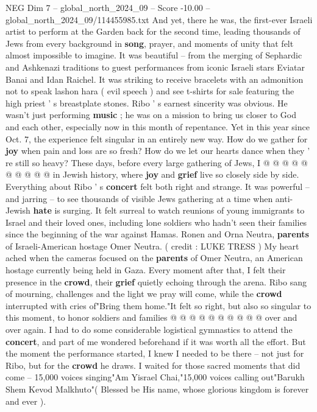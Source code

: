 \begin{textsample}{NEG Dim 7 – global\_north\_2024\_09 – Score -10.00 – global\_north\_2024\_09/114455985.txt}  \label{ex:f7_neg_015}
And yet, there he was, the first-ever Israeli artist to perform at the Garden back for the second time, leading thousands of Jews from every background in \textbf{song}, prayer, and moments of unity that felt almost impossible to imagine.
It was beautiful -- from the merging of Sephardic and Ashkenazi traditions to guest performances from iconic Israeli stars Eviatar Banai and Idan Raichel.
It was striking to receive bracelets with an admonition not to speak lashon hara ( evil speech ) and see t-shirts for sale featuring the high priest ' s breastplate stones.
Ribo ' s earnest sincerity was obvious.
He wasn't just performing \textbf{music} ; he was on a mission to bring us closer to God and each other, especially now in this month of repentance.
Yet in this year since Oct. 7, the experience felt singular in an entirely new way.
How do we gather for \textbf{joy} when pain and loss are so fresh?
How do we let our hearts dance when they ' re still so heavy?
These days, before every large gathering of Jews, I @ @ @ @ @ @ @ @ @ @ in Jewish history, where \textbf{joy} and \textbf{grief} live so closely side by side.
Everything about Ribo ' s \textbf{concert} felt both right and strange.
It was powerful -- and jarring -- to see thousands of visible Jews gathering at a time when anti-Jewish \textbf{hate} is surging.
It felt surreal to watch reunions of young immigrants to Israel and their loved ones, including lone soldiers who hadn't seen their families since the beginning of the war against Hamas.
Ronen and Orna Neutra, \textbf{parents} of Israeli-American hostage Omer Neutra. ( credit : LUKE TRESS ) My heart ached when the cameras focused on the \textbf{parents} of Omer Neutra, an American hostage currently being held in Gaza.
Every moment after that, I felt their presence in the \textbf{crowd}, their \textbf{grief} quietly echoing through the arena.
Ribo sang of mourning, challenges and the light we pray will come, while the \textbf{crowd} interrupted with cries of"Bring them home."It felt so right, but also so singular to this moment, to honor soldiers and families @ @ @ @ @ @ @ @ @ @ over and over again.
I had to do some considerable logistical gymnastics to attend the \textbf{concert}, and part of me wondered beforehand if it was worth all the effort.
But the moment the performance started, I knew I needed to be there -- not just for Ribo, but for the \textbf{crowd} he draws.
I waited for those sacred moments that did come -- 15,000 voices singing"Am Yisrael Chai,"15,000 voices calling out"Barukh Shem Kevod Malkhuto"( Blessed be His name, whose glorious kingdom is forever and ever ).

\end{textsample}
